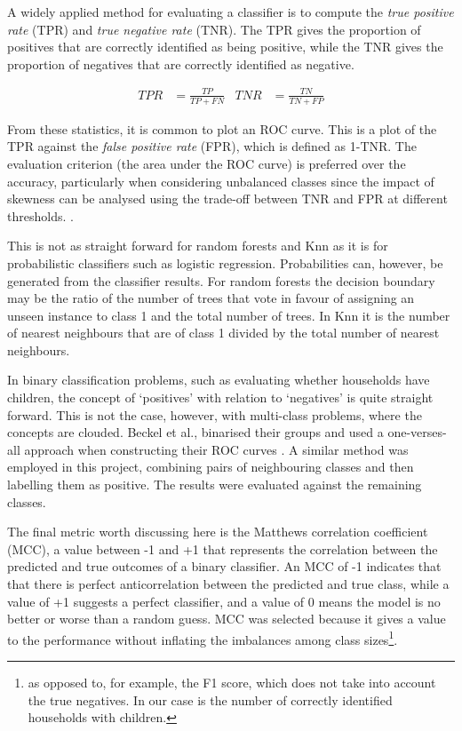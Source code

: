 A widely applied method for evaluating a classifier is to compute the \textit{true positive rate} (TPR) and \textit{true negative rate} (TNR). The TPR gives the proportion of positives that are correctly identified as being positive, while the TNR gives the proportion of negatives that are correctly identified as negative.

\begin{align*}
TPR&=\frac{TP}{TP+FN}   &   TNR&=\frac{TN}{TN+FP}   
\end{align*}

From these statistics, it is common to plot an ROC curve.  This is a plot of the TPR against the \textit{false positive rate} (FPR), which is defined as 1-TNR. The evaluation criterion (the area under the ROC curve) is preferred over the accuracy, particularly when considering unbalanced classes since the impact of skewness can be analysed using the trade-off between TNR and FPR at different thresholds. \cite{Waegeman}. 

This is not as straight forward for random forests and Knn as it is for probabilistic classifiers such as logistic regression. Probabilities can, however, be generated from the classifier results. For random forests the decision boundary may be the ratio of the number of trees that vote in favour of assigning an unseen instance to class 1 and the total number of trees. In Knn it is the number of nearest neighbours that are of class 1 divided by the total number of nearest neighbours.

In binary classification problems, such as evaluating whether households have children, the concept of `positives' with relation to `negatives' is quite straight forward.  This is not the case, however, with multi-class problems, where the concepts are clouded. Beckel et al., binarised their groups and used a one-verses-all approach when constructing their ROC curves \cite{Beckel_2,Beckel_3}.  A similar method was employed in this project, combining pairs of neighbouring classes and then labelling them as positive.  The results were evaluated against the remaining classes.

The final metric worth discussing here is the Matthews correlation coefficient (MCC), a value between -1 and +1 that represents the correlation between the predicted and true outcomes of a binary classifier. An MCC of -1 indicates that that there is perfect anticorrelation between the predicted and true class, while a value of +1 suggests a perfect classifier, and a value of 0 means the model is no better or worse than a random guess. MCC was selected because it gives a value to the performance without inflating the imbalances among class sizes\footnote{as opposed to, for example, the F1 score, which does not take into account the true negatives. In our case is the number of correctly identified households with children.}\cite{Powers}.

